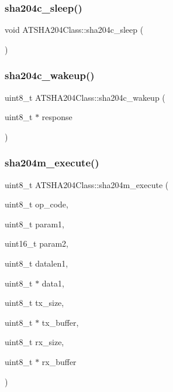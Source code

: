 \subsubsection{\texorpdfstring{sha204c\+\_\+sleep()}{sha204c\_sleep()}}
{\footnotesize\ttfamily void A\+T\+S\+H\+A204\+Class\+::sha204c\+\_\+sleep (\begin{DoxyParamCaption}{ }\end{DoxyParamCaption})}

\mbox{\label{classATSHA204Class_a2772385d612dee11f65c310334d7952b}} 
\subsubsection{\texorpdfstring{sha204c\+\_\+wakeup()}{sha204c\_wakeup()}}
{\footnotesize\ttfamily uint8\+\_\+t A\+T\+S\+H\+A204\+Class\+::sha204c\+\_\+wakeup (\begin{DoxyParamCaption}\item[{uint8\+\_\+t $\ast$}]{response }\end{DoxyParamCaption})\hspace{0.3cm}{\ttfamily [private]}}

\mbox{\label{classATSHA204Class_a8600d67f5c574e1584ef5555429f305b}} 
\subsubsection{\texorpdfstring{sha204m\+\_\+execute()}{sha204m\_execute()}}
{\footnotesize\ttfamily uint8\+\_\+t A\+T\+S\+H\+A204\+Class\+::sha204m\+\_\+execute (\begin{DoxyParamCaption}\item[{uint8\+\_\+t}]{op\+\_\+code,  }\item[{uint8\+\_\+t}]{param1,  }\item[{uint16\+\_\+t}]{param2,  }\item[{uint8\+\_\+t}]{datalen1,  }\item[{uint8\+\_\+t $\ast$}]{data1,  }\item[{uint8\+\_\+t}]{tx\+\_\+size,  }\item[{uint8\+\_\+t $\ast$}]{tx\+\_\+buffer,  }\item[{uint8\+\_\+t}]{rx\+\_\+size,  }\item[{uint8\+\_\+t $\ast$}]{rx\+\_\+buffer }\end{DoxyParamCaption})}

